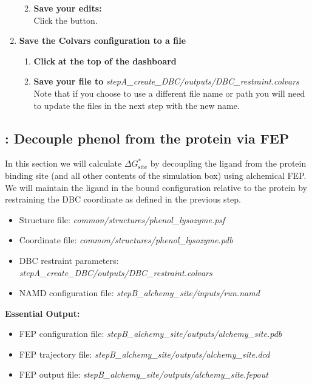 \documentclass[9pt,tutorial,pubversion]{Styling/livecoms}
\newcommand{\filepath}[1]{\textit{#1}}
\newcommand{\button}[1]{\inlineBox[gray]{\texttt{#1}}}
\begin{document}
\begin{enumerate}
\begin{enumerate}[label=\alph*., ref=\theenumi.\alph*]
\begin{itemize}
            \end{itemize}
            \item \textbf{Save your edits:}\\
            Click the \button{Apply [Ctrl-s]} button.
        \end{enumerate}
        \item \textbf{Save the Colvars configuration to a file}
        \begin{enumerate}[label=\alph*., ref=\theenumi.\alph*]
            \item \textbf{Click} \button{Save} \textbf{at the top of the dashboard}
            \item \textbf{Save your file to} \filepath{stepA\_create\_DBC/outputs/DBC\_restraint.colvars}\\
            Note that if you choose to use a different file name or path you will need to update the files in the next step with the new name.
        \end{enumerate}
    \end{enumerate}

\subsection{\hspace{-1em}: Decouple phenol from the protein via FEP}\label{step:proteinDecouple}
    \begin{tcolorbox}[colback=blue!5!white,colframe=blue!75!black]
    In this section we will calculate $\Delta G_\mathrm{site}^*$ by decoupling the ligand from the protein binding site (and all other contents of the simulation box) using alchemical FEP.
    We will maintain the ligand in the bound configuration relative to the protein by restraining the DBC coordinate as defined in the previous step.
    \end{tcolorbox}
    
    \begin{itemize}
        \item Structure file: \filepath{common/structures/phenol\_lysozyme.psf} 
        \item Coordinate file: \filepath{common/structures/phenol\_lysozyme.pdb}
        \item DBC restraint parameters: \filepath{stepA\_create\_DBC/outputs/DBC\_restraint.colvars}
        \item NAMD configuration file: \filepath{stepB\_alchemy\_site/inputs/run.namd}
    \end{itemize}
    \textbf{Essential Output:}
    \begin{itemize}
        \item FEP configuration file: \filepath{stepB\_alchemy\_site/outputs/alchemy\_site.pdb}
        \item FEP trajectory file: \filepath{stepB\_alchemy\_site/outputs/alchemy\_site.dcd}
        \item FEP output file: \filepath{stepB\_alchemy\_site/outputs/alchemy\_site.fepout}
    \end{itemize}
    
\end{document}
